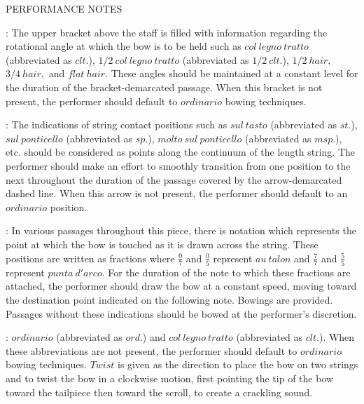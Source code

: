 \documentclass[11pt]{article}
\newcommand*\circled[1]{\tikz[baseline=(char.base)]{
            \node[shape=circle,draw,inner sep=1pt] (char) {#1};}}
\begin{document}
\begin{center}
\huge PERFORMANCE NOTES
\end{center}
\begingroup
\begin{center}

 : The upper bracket above the staff is filled with information regarding the rotational angle at which the bow is to be held such as $col \ legno \ tratto$ (abbreviated as $clt.$), $1/2 \ col \ legno \ tratto$ (abbreviated as $1/2 \ clt.$), $1/2 \ hair,$ $3/4 \ hair,$ and $flat \ hair.$ These angles should be maintained at a constant level for the duration of the bracket-demarcated passage. When this bracket is not present, the performer should default to $ordinario$ bowing techniques.
\rightskip\leftskip
\phantom{text} \hfill \phantom{()}

 : The indications of string contact positions such as $sul \ tasto$ (abbreviated as $st.$), $sul \ ponticello$ (abbreviated as $sp.$), $molto \ sul \ ponticello$ (abbreviated as $msp.$), etc. should be considered as points along the continuum of the length string. The performer should make an effort to smoothly transition from one position to the next throughout the duration of the passage covered by the arrow-demarcated dashed line. When this arrow is not present, the performer should default to an $ordinario$ position.
\rightskip\leftskip
\phantom{text} \hfill \phantom{()}

 : In various passages throughout this piece, there is notation which represents the point at which the bow is touched as it is drawn across the string. These positions are written as fractions where \( \frac{0}{7} \) and  \( \frac{0}{5} \) represent $au \ talon$ and \( \frac{7}{7} \) and \( \frac{5}{5} \) represent $punta \ d'arco$. For the duration of the note to which these fractions are attached, the performer should draw the bow at a constant speed, moving toward the destination point indicated on the following note. Bowings are provided. Passages without these indications should be bowed at the performer's discretion.
\rightskip\leftskip
\phantom{text} \hfill \phantom{()}

 : \circled{1} $ordinario$ (abbreviated as $ord.$) and \circled{2} $col \ legno \ tratto$ (abbreviated as $clt.$). When these abbreviations are not present, the performer should default to $ordinario$ bowing techniques. \circled{3} $Twist$ is given as the direction to place the bow on two strings and to twist the bow in a clockwise motion, first pointing the tip of the bow toward the tailpiece then toward the scroll, to create a crackling sound.
\rightskip\leftskip


\end{center}
\end{document}
